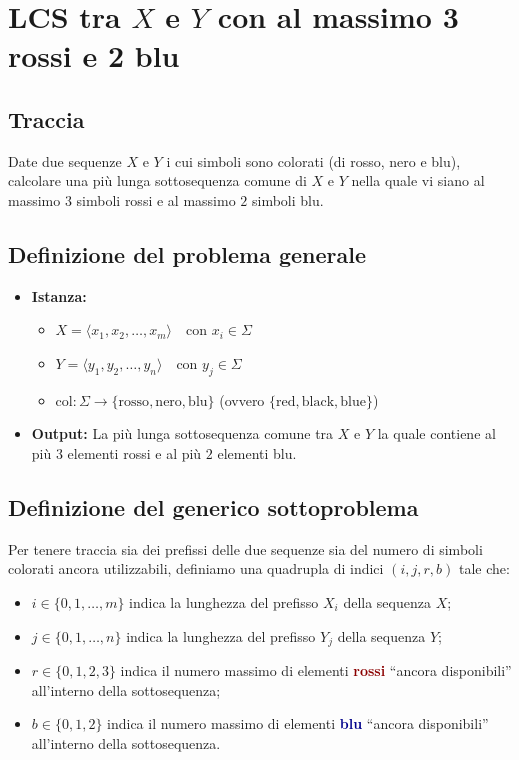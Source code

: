 

\chapter{LCS tra $X$ e $Y$ con al massimo 3 rossi e 2 blu}

\section{Traccia}
Date due sequenze $X$ e $Y$ i cui simboli sono colorati (di rosso, nero e blu), calcolare una più lunga sottosequenza comune di $X$ e $Y$ nella quale vi siano al massimo $3$ simboli rossi e al massimo $2$ simboli blu.

\section{Definizione del problema generale}

\begin{itemize}
    \item \textbf{Istanza:}
    \begin{itemize}
        \item $X = \langle x_1, x_2, \dots, x_m \rangle \quad \text{con } x_i \in \Sigma$
        \item $Y = \langle y_1, y_2, \dots, y_n \rangle \quad \text{con } y_j \in \Sigma$
        \item $\text{col} : \Sigma \longrightarrow \{\text{rosso}, \text{nero}, \text{blu}\}$ (ovvero $\{\text{red}, \text{black}, \text{blue}\}$)
    \end{itemize}
    \item \textbf{Output:} La più lunga sottosequenza comune tra $X$ e $Y$ la quale contiene al più $3$ elementi rossi e al più $2$ elementi blu.
\end{itemize}

\section{Definizione del generico sottoproblema}

Per tenere traccia sia dei prefissi delle due sequenze sia del numero di simboli colorati ancora utilizzabili, definiamo una quadrupla di indici $(i, j, r, b)$ tale che:
\begin{itemize}
    \item $i \in \{0, 1, \dots, m\}$ indica la lunghezza del prefisso $X_i$ della sequenza $X$;
    \item $j \in \{0, 1, \dots, n\}$ indica la lunghezza del prefisso $Y_j$ della sequenza $Y$;
    \item $r \in \{0, 1, 2, 3\}$ indica il numero massimo di elementi \textcolor{darkred}{\textbf{rossi}} ``ancora disponibili'' all'interno della sottosequenza;
    \item $b \in \{0, 1, 2\}$ indica il numero massimo di elementi \textcolor{darkblue}{\textbf{blu}} ``ancora disponibili'' all'interno della sottosequenza.
\end{itemize}


